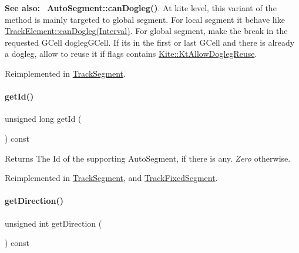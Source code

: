 {\bfseries See also\+:}~ \textbf{ Auto\+Segment\+::can\+Dogleg()}. At kite level, this variant of the method is mainly targeted to global segment. For local segment it behave like \hyperlink{classKite_1_1TrackElement_accb4c6a7ee2678a0cff4dbc4a7860fe1}{Track\+Element\+::can\+Dogleg(\+Interval)}. For global segment, make the break in the requested G\+Cell {\ttfamily dogleg\+G\+Cell}. If it\textquotesingle{}s in the first or last G\+Cell and there is already a dogleg, allow to reuse it if {\ttfamily flags} contains \hyperlink{namespaceKite_acca8fffa3182dea5f94208f454f14b47a766f453d6caa06490196a952762f0bb8}{Kite\+::\+Kt\+Allow\+Dogleg\+Reuse}. 

Reimplemented in \hyperlink{classKite_1_1TrackSegment_a4f040cf33009e4886d401115c3bea838}{Track\+Segment}.

\mbox{\label{classKite_1_1TrackElement_afdedcef127ad2a3677a5b48d7d3453f3}} 
\paragraph{\texorpdfstring{get\+Id()}{getId()}}
{\footnotesize\ttfamily unsigned long get\+Id (\begin{DoxyParamCaption}{ }\end{DoxyParamCaption}) const\hspace{0.3cm}{\ttfamily [virtual]}}

\begin{DoxyReturn}{Returns}
The {\ttfamily Id} of the supporting Auto\+Segment, if there is any. {\itshape Zero} otherwise. 
\end{DoxyReturn}


Reimplemented in \hyperlink{classKite_1_1TrackSegment_afdedcef127ad2a3677a5b48d7d3453f3}{Track\+Segment}, and \hyperlink{classKite_1_1TrackFixedSegment_afdedcef127ad2a3677a5b48d7d3453f3}{Track\+Fixed\+Segment}.

\mbox{\label{classKite_1_1TrackElement_ae35b78590ed6aa546b626ef95f28c533}} 
\paragraph{\texorpdfstring{get\+Direction()}{getDirection()}}
{\footnotesize\ttfamily unsigned int get\+Direction (\begin{DoxyParamCaption}{ }\end{DoxyParamCaption}) const\hspace{0.3cm}{\ttfamily [pure virtual]}}

